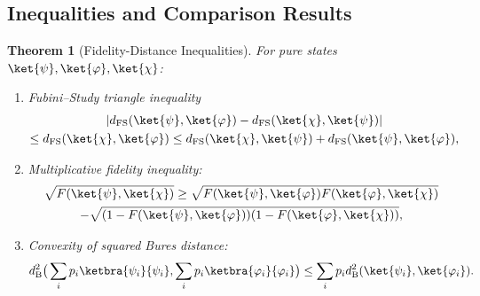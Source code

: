 \documentclass[aps,pra,reprint,nofootinbib,showpacs,superscriptaddress]{revtex4-1}
\newtheorem{theorem}{Theorem}[section]
\begin{document}
\subsection{Inequalities and Comparison Results}

\begin{theorem}[Fidelity-Distance Inequalities]
\label{thm:fidelity-inequalities}
For pure states $\ket{\psi},\ket{\varphi},\ket{\chi}$:
\begin{enumerate}[label=(\roman*)]
    \item Fubini--Study triangle inequality
    \begin{multline}\notag 
        |d_{\text{FS}}(\ket{\psi},\ket{\varphi}) - d_{\text{FS}}(\ket{\chi},\ket{\psi})| \\
        \le d_{\text{FS}}(\ket{\chi},\ket{\varphi}) \le d_{\text{FS}}(\ket{\chi},\ket{\psi}) + d_{\text{FS}}(\ket{\psi},\ket{\varphi}),
    \end{multline}
    \item Multiplicative fidelity inequality:
    \begin{multline}\notag 
    \sqrt{F(\ket{\psi},\ket{\chi})} \ge \sqrt{F(\ket{\psi},\ket{\varphi}) F(\ket{\varphi},\ket{\chi})} \\
    - \sqrt{(1-F(\ket{\psi},\ket{\varphi}))(1-F(\ket{\varphi},\ket{\chi}))},
    \end{multline}
    \item Convexity of squared Bures distance:
    \begin{multline}\notag 
    d_{\text{B}}^2\big(\sum_i p_i \ketbra{\psi_i}{\psi_i}, \sum_i p_i \ketbra{\varphi_i}{\varphi_i}\big) \le \sum_i p_i d_{\text{B}}^2(\ket{\psi_i},\ket{\varphi_i}).
    \end{multline}
\end{enumerate}
\end{theorem}
\end{document}
